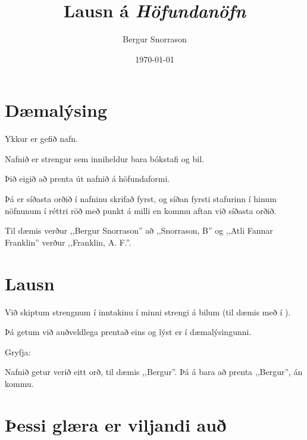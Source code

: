 \title{Lausn á \emph{Höfundanöfn}}
\author{Bergur Snorrason}
\date{\today}



\frame{\titlepage}

\section{Dæmalýsing}
{
	{
		\item<1-> Ykkur er gefið nafn.
		\item<2-> Nafnið er strengur sem inniheldur bara bókstafi og bil.
		\item<3-> Þið eigið að prenta út nafnið á höfundaformi.
		\item<4-> Þá er síðasta orðið í nafninu skrifað fyrst,
					og síðan fyrsti stafurinn í hinum nöfnunum í réttri röð með punkt á milli en kommu aftan við síðasta orðið.
		\item<5-> Til dæmis verður ,,Bergur Snorrason'' að ,,Snorrason, B'' og
					,,Atli Fannar Franklin'' verður ,,Franklin, A. F.''.
	}
}

\section{Lausn}
{
	{
		\item<1-> Við skiptum strengnum í inntakinu í minni strengi á bilum (til dæmis með  í ).
		\item<2-> Þá getum við auðveldlega prentað eins og lýst er í dæmalýsingunni.
		\item<3-> Gryfja:
		{
			\item<4-> Nafnið getur verið eitt orð, til dæmis ,,Bergur''. Þá á bara að prenta ,,Bergur'', án kommu.
		}
	}
}

\section{Þessi glæra er viljandi auð}
{
}


